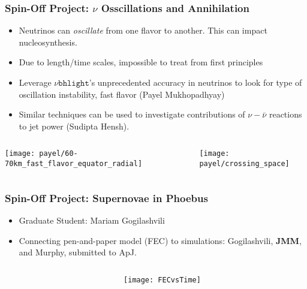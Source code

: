 \documentclass[]{beamer}
\begin{document}
\begin{frame}
  \frametitle{Spin-Off Project: $\nu$ Osscillations and Annihilation}
  \begin{itemize}
  \item Neutrinos can \textit{oscillate} from one flavor to
    another. This can impact nucleosynthesis.
  \item Due to length/time scales, impossible to treat from first principles
  \item Leverage $\nu\texttt{bhlight}$'s unprecedented accuracy in neutrinos to look for type of oscillation instability, fast flavor (Payel Mukhopadhyay)
  \item Similar techniques can be used to investigate contributions of
    $\nu-\bar{\nu}$ reactions to jet power (Sudipta Hensh).
  \end{itemize}
  \begin{columns}
    \begin{column}{6cm}
      \begin{center}
        \texttt{[image: payel/60-70km\_fast\_flavor\_equator\_radial]}
      \end{center}
    \end{column}
    \begin{column}{6cm}
      \begin{center}
        \texttt{[image: payel/crossing\_space]}
      \end{center}
    \end{column}
  \end{columns}
\end{frame}

\begin{frame}
  \frametitle{Spin-Off Project: Supernovae in Phoebus}
  \begin{itemize}
  \item Graduate Student: Mariam Gogilashvili
  \item Connecting pen-and-paper model (FEC) to simulations: Gogilashvili, \textbf{JMM}, and Murphy, submitted to ApJ.
  \end{itemize}
  \begin{columns}
    \begin{column}{6cm}
      \begin{center}
      \end{center}
    \end{column}
    \begin{column}{6cm}
      \begin{center}
        \texttt{[image: FECvsTime]}
      \end{center}
    \end{column}
  \end{columns}
\end{frame}
\end{document}
